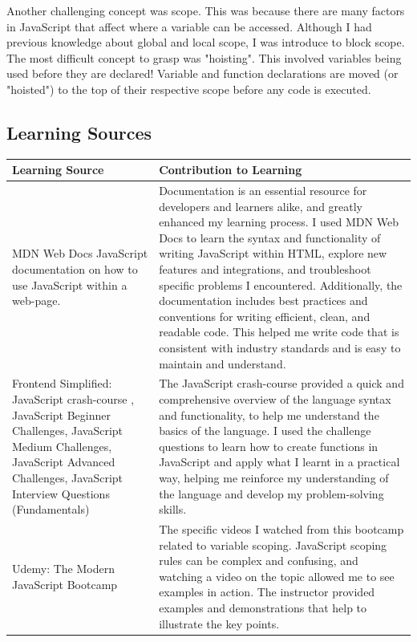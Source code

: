 \documentclass[a4paper, 11pt]{report}
\begin{document}
Another challenging concept was scope. This was because there are many factors in JavaScript that affect where a variable can be accessed. Although I had previous knowledge about global and local scope, I was introduce to block scope. The most difficult concept to grasp was "hoisting". This involved variables being used before they are declared! Variable and function declarations are moved (or "hoisted") to the top of their respective scope before any code is executed.


\subsection{Learning Sources}

\begin{tabular}{|p{}|p{}|}
	\hline
	Learning Source & Contribution to Learning \\
	\hline
	MDN Web Docs\cite{MDN_HTML_JS} JavaScript documentation on how to use JavaScript within a web-page. & Documentation is an essential resource for developers and learners alike, and greatly enhanced my learning process. I used MDN Web Docs to learn the syntax and functionality of writing JavaScript within HTML, explore new features and integrations, and troubleshoot specific problems I encountered.  Additionally, the documentation includes best practices and conventions for writing efficient, clean, and readable code. This helped me write code that is consistent with industry standards and is easy to maintain and understand.\\
	\hline
	Frontend Simplified: JavaScript crash-course \cite{FES_JS_Crash_Course}, JavaScript Beginner Challenges\cite{FES_JS_Beginner}, JavaScript Medium Challenges\cite{FES_JS_Medium}, JavaScript Advanced Challenges\cite{FES_JS_Hard}, JavaScript Interview Questions 
 (Fundamentals) \cite{FES_JS_Interview}& The JavaScript crash-course provided a quick and comprehensive overview of the language syntax and functionality, to help me understand the basics of the language. I used the challenge questions to learn how to create functions in JavaScript and apply what I learnt in a practical way, helping me reinforce my understanding of the language and develop my problem-solving skills. \\
	\hline
	Udemy: The Modern JavaScript Bootcamp\cite{Udemy_JS_Course} & The specific videos I watched from this bootcamp related to variable scoping. JavaScript scoping rules can be complex and confusing, and watching a video on the topic allowed me to see examples in action. The instructor provided examples and demonstrations that help to illustrate the key points.\\
	\hline
\end{tabular}
\end{document}
